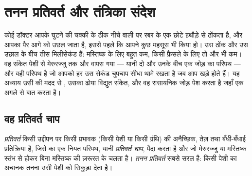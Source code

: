 \chapter{तनन प्रतिवर्त और तंत्रिका संदेश}\label{ch:g12:stretch-reflex}

कोई डॉक्टर आपके घुटने की चक्की के ठीक नीचे वाली  पर रबर के एक छोटे
हथौड़े से ठोंकता है, और आपका पैर आगे को उछल जाता है, इससे पहले कि आपने कुछ
महसूस भी किया हो। उस ठोंक और उस उछाल के बीच तीस मिलीसेकंड हैं: मस्तिष्क के
लिए बहुत कम, किसी फ़ैसले के लिए तो और भी कम। वह संकेत पेशी से मेरुरज्जु तक
और वापस गया --- यानी दो  और उनके बीच एक जोड़ का परिपथ --- और वही
परिपथ है जो आपको हर उस सेकंड चुपचाप सीधा थामे रखता है जब आप खड़े होते हैं।
यह अध्याय उसी की मदद से , उसका ढोया विद्युत संकेत, और वह रासायनिक
जोड़ पेश करता है जहाँ एक  अगले से बात करता है।

\section{वह प्रतिवर्त चाप}

\begin{definition}[प्रतिवर्त]\label{def:g12:stretch-reflex:reflex}
\emph{प्रतिवर्त} किसी उद्दीपन पर किसी प्रभावक (किसी पेशी
या किसी ग्रंथि) की अनैच्छिक, तेज़ तथा बँधी-बँधाई प्रतिक्रिया है, जिसे
 का एक नियत परिपथ, यानी
\emph{प्रतिवर्त चाप}, पैदा करता है और जो मेरुरज्जु या
मस्तिष्क स्तंभ से होकर बिना मस्तिष्क की ज़रूरत के चलता है।
\emph{तनन प्रतिवर्त} सबसे सरल है: किसी पेशी का अचानक
तनना उसी पेशी को सिकुड़ा देता है।
\end{definition}

